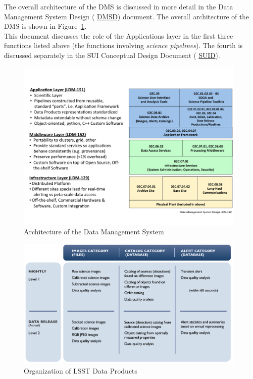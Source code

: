\documentclass[12pt]{article}
\newcommand{\ds}[2]{{\color{blue} \href{https://docushare.lsstcorp.org/docushare/dsweb/Get/#1}{#2}}\xspace}
\newcommand{\SUI}{\ds{LDM-131}{SUID}}
\newcommand{\DMSD}{\ds{LDM-148}{DMSD}}
\begin{document}
The overall architecture of the DMS is discussed in more detail in the Data Management System Design (\DMSD) document. The overall architecture of the DMS is shown in Figure~\ref{fig:DMS}.
\\

This document discusses the role of the Applications layer in the first three functions listed above (the functions involving {\em science pipelines}).  The fourth is discussed separately in the SUI Conceptual Design Document (\SUI).

\begin{figure}
\centering
\includegraphics[angle=90,scale=0.70]{DMS-Architecture.pdf}
\caption{Architecture of the Data Management System\label{fig:DMS}}
\end{figure}

\begin{figure}
\centering
\includegraphics[angle=90]{DataProductDelivarables.png}
\caption{Organization of LSST Data Products\label{fig:DP}}
\end{figure}
\end{document}

